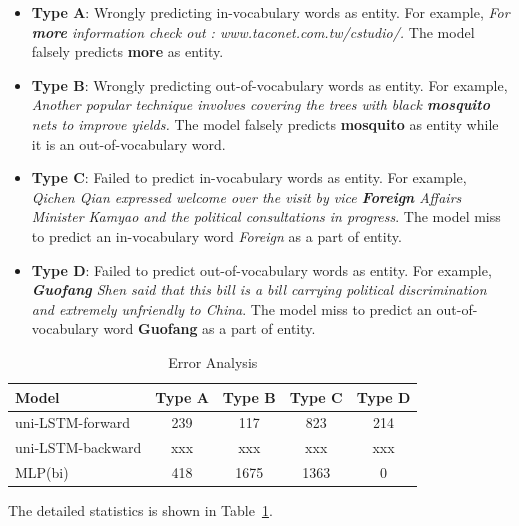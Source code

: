 \documentclass{article}
\begin{document}
\begin{itemize}
	\item \textbf{Type A}: Wrongly predicting in-vocabulary words as entity. For example,\textit{ For \textbf{more} information check out : www.taconet.com.tw/cstudio/.} The model falsely predicts \textbf{more} as entity.
	\item \textbf{Type B}: Wrongly predicting out-of-vocabulary words as entity. For example, \textit{Another popular technique involves covering the trees with black \textbf{mosquito} nets to improve yields.} The model falsely predicts \textbf{mosquito} as entity while it is an out-of-vocabulary word.
	\item \textbf{Type C}: Failed to predict in-vocabulary words as entity. For example, \textit{Qichen Qian expressed welcome over the visit by vice \textbf{Foreign} Affairs Minister Kamyao and the political consultations in progress}. The model miss to predict an in-vocabulary word \textit{Foreign} as a part of entity.
	\item \textbf{Type D}: Failed to predict out-of-vocabulary words as entity. For example, \textit{\textbf{Guofang} Shen said that this bill is a bill carrying political discrimination and extremely unfriendly to China}. The model miss to predict an out-of-vocabulary word \textbf{Guofang} as a part of entity.
\end{itemize}

\begin{table}[t]
	\centering
	\begin{tabular}{l@{\qquad}cccc}
		\toprule
		\textbf{Model}         & Type A & Type B & Type C & Type D \\ \midrule
		uni-LSTM-forward &  239  & 117 & 823 & 214 \\
		uni-LSTM-backward & xxx & xxx & xxx & xxx  \\
		MLP(bi) & 418 & 1675 & 1363 & 0  \\ 
		\bottomrule
	\end{tabular}
	\vspace{3mm}
	\caption{Error Analysis }
	\label{res:ner_error}
\end{table}


The detailed statistics is shown in Table~\ref{res:ner_error}. 
\end{document}
